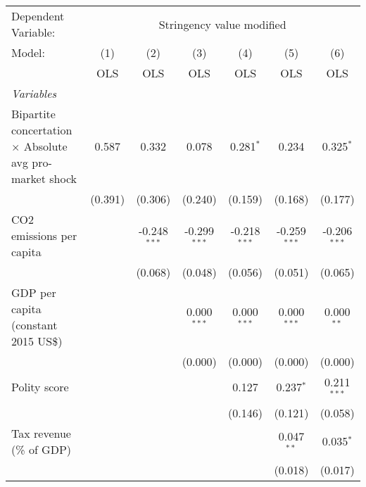
\begingroup
\centering
\begin{tabular}{lcccccc}
   \toprule
   Dependent Variable: & \multicolumn{6}{c}{Stringency value modified}\\
   Model:                                                         & (1)     & (2)            & (3)            & (4)            & (5)            & (6)\\  
                                                                  &  OLS    & OLS            & OLS            & OLS            & OLS            & OLS\\  
   \midrule
   \emph{Variables}\\
   Bipartite concertation $\times$ Absolute avg pro-market shock  & 0.587   & 0.332          & 0.078          & 0.281$^{*}$    & 0.234          & 0.325$^{*}$\\   
                                                                  & (0.391) & (0.306)        & (0.240)        & (0.159)        & (0.168)        & (0.177)\\   
   CO2 emissions per capita                                       &         & -0.248$^{***}$ & -0.299$^{***}$ & -0.218$^{***}$ & -0.259$^{***}$ & -0.206$^{***}$\\   
                                                                  &         & (0.068)        & (0.048)        & (0.056)        & (0.051)        & (0.065)\\   
   GDP per capita (constant 2015 US\$)                            &         &                & 0.000$^{***}$  & 0.000$^{***}$  & 0.000$^{***}$  & 0.000$^{**}$\\   
                                                                  &         &                & (0.000)        & (0.000)        & (0.000)        & (0.000)\\   
   Polity score                                                   &         &                &                & 0.127          & 0.237$^{*}$    & 0.211$^{***}$\\   
                                                                  &         &                &                & (0.146)        & (0.121)        & (0.058)\\   
   Tax revenue (\% of GDP)                                        &         &                &                &                & 0.047$^{**}$   & 0.035$^{*}$\\   
                                                                  &         &                &                &                & (0.018)        & (0.017)\\   

\end{tabular}
